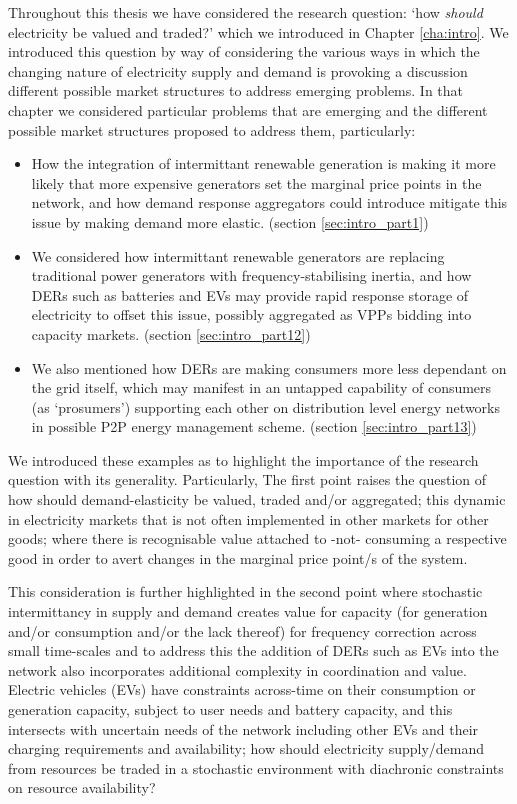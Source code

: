 Throughout this thesis we have considered the research question: `how \textit{should} electricity be valued and traded?' which we introduced in Chapter \ref{cha:intro}.
We introduced this question by way of considering the various ways in which the changing nature of electricity supply and demand is provoking a discussion different possible market structures to address emerging problems.
In that chapter we considered particular problems that are emerging and the different possible market structures proposed to address them, particularly:
\begin{itemize}
\item	How the integration of intermittant renewable generation is making it more likely that more expensive generators set the marginal price points in the network, and how demand response aggregators could introduce mitigate this issue by making demand more elastic. (section \ref{sec:intro_part1})
\item	We considered how intermittant renewable generators are replacing traditional power generators with frequency-stabilising inertia, and how DERs such as batteries and EVs may provide rapid response storage of electricity to offset this issue, possibly aggregated as VPPs bidding into capacity markets. (section \ref{sec:intro_part12})
\item	We also mentioned how DERs are making consumers more less dependant on the grid itself, which may manifest in an untapped capability of consumers (as `prosumers') supporting each other on distribution level energy networks in possible P2P energy management scheme. (section \ref{sec:intro_part13})
\end{itemize}

We introduced these examples as to highlight the importance of the research question with its generality.
Particularly, The first point raises the question of how should demand-elasticity be valued, traded and/or aggregated; this dynamic in electricity markets that is not often implemented in other markets for other goods; where there is recognisable value attached to -not- consuming a respective good in order to avert changes in the marginal price point/s of the system.

This consideration is further highlighted in the second point where stochastic intermittancy in supply and demand creates value for capacity (for generation and/or consumption and/or the lack thereof) for frequency correction across small time-scales and to address this the addition of DERs such as EVs into the network also incorporates additional complexity in coordination and value.
Electric vehicles (EVs) have constraints across-time on their consumption or generation capacity, subject to user needs and battery capacity, and this intersects with uncertain needs of the network including other EVs and their charging requirements and availability; how should electricity supply/demand from resources be traded in a stochastic environment with diachronic constraints on resource availability?

